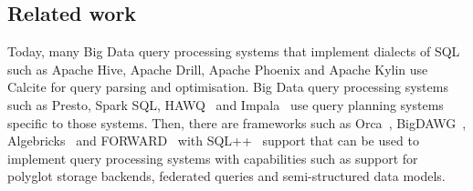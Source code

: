 \subsection{Related work}
\label{subsec:related}


Today, many Big Data query processing systems that implement dialects of SQL such as Apache Hive, Apache Drill, Apache Phoenix and Apache Kylin use Calcite for query parsing and optimisation. Big Data query processing systems such as Presto, Spark SQL, HAWQ~\cite{chang2014hawq} and Impala~\cite{kornacker2015impala} use query planning systems specific to those systems. Then,  there are frameworks such as Orca~\cite{Soliman:2014:OMQ:2588555.2595637}, BigDAWG~\cite{duggan2015bigdawg}, Algebricks~\cite{borkar2015algebricks} and FORWARD~\cite{fu2011sql} with SQL++~\cite{ong2014sql++} support that can be used to implement query processing systems with capabilities such as support for polyglot storage backends, federated queries and semi-structured data models.

